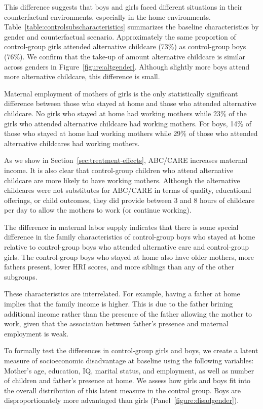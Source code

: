 This difference suggests that boys and girls faced different situations in their counterfactual environments, especially in the home environments. Table~\ref{table:controlsubscharacteristics} summarizes the baseline characteristics by gender and counterfactual scenario. Approximately the same proportion of control-group girls attended alternative childcare (73\%)  as control-group boys (76\%). We confirm that the take-up of amount alternative childcare is similar across genders in Figure~\ref{figure:altgender}. Although slightly more boys attend more alternative childcare, this difference is small.

Maternal employment of mothers of girls is the only statistically significant difference between those who stayed at home and those who attended alternative childcare. No girls who stayed at home had working mothers while 23\% of the girls who attended alternative childcare had working mothers. For boys, 14\% of those who stayed at home had working mothers while 29\% of those who attended alternative childcares had working mothers. 

As we show in Section~\ref{sec:treatment-effects}, ABC/CARE increases maternal income. It is also clear that control-group children who attend alternative childcare are more likely to have working mothers. Although the alternative childcares were not substitutes for ABC/CARE in terms of quality, educational offerings, or child outcomes, they did provide between 3 and 8 hours of childcare per day to allow the mothers to work (or continue working).

The difference in maternal labor supply indicates that there is some special difference in the family characteristics of control-group boys who stayed at home relative to control-group boys who attended alternative care and control-group girls. The control-group boys who stayed at home also have older mothers, more fathers present, lower HRI scores, and more siblings than any of the other subgroups. 

These characteristics are interrelated. For example, having a father at home implies that the family income is higher. This is due to the father brining additional income rather than the presence of the father allowing the mother to work, given that the association between father's presence and maternal employment is weak. 

To formally test the differences in control-group girls and boys, we create a latent measure of socioeconomic disadvantage at baseline using the following variables: Mother's age, education, IQ, marital status, and employment, as well as number of children and father's presence at home. We assess how girls and boys fit into the overall distribution of this latent measure in the control group. Boys are disproportionately more advantaged than girls (Panel~\ref{figure:disadgender}). 

